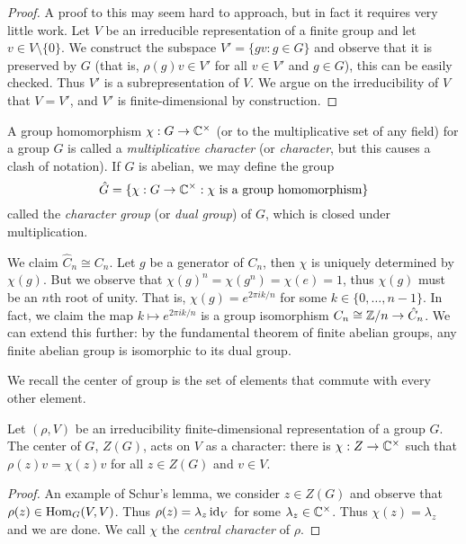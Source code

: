 \begin{proof}
  A proof to this may seem hard to approach, but in fact it requires very little work. Let $V$ be an irreducible representation of a finite group and let $v \in V \setminus \{0\}$. We construct the subspace $V' = \{gv: g \in G\}$ and observe that it is preserved by $G$ (that is, $\rho(g)v \in V'$ for all $v \in V'$ and $g \in G$), this can be easily checked. Thus $V'$ is a subrepresentation of $V$. We argue on the irreducibility of $V$ that $V = V'$, and $V'$ is finite-dimensional by construction.
\end{proof}

A group homomorphism $\chi: G \to \mathbb{C}^\times$ (or to the multiplicative set of any field) for a group $G$ is called a \emph{multiplicative character} (or \emph{character}, but this causes a clash of notation). If $G$ is abelian, we may define the group
\[ \hat G = \{\chi: G \to \mathbb{C}^\times: \text{$\chi$ is a group homomorphism}\} \]
called the \emph{character group} (or \emph{dual group}) of $G$, which is closed under multiplication.

\begin{example}
  We claim $\hat C_n \cong C_n$. Let $g$ be a generator of $C_n$, then $\chi$ is uniquely determined by $\chi(g)$. But we observe that $\chi(g)^n = \chi(g^n)=\chi(e)=1$, thus $\chi(g)$ must be an $n$th root of unity. That is, $\chi(g) = e^{2\pi i k/n}$ for some $k \in \{0, \ldots, n-1\}$. In fact, we claim the map $k \mapsto e^{2\pi i k/n}$ is a group isomorphism $C_n \cong \mathbb{Z}/n \to \hat C_n$. We can extend this further: by the fundamental theorem of finite abelian groups, any finite abelian group is isomorphic to its dual group.
\end{example}

We recall the center of group is the set of elements that commute with every other element.

\begin{proposition}
  Let $(\rho, V)$ be an irreducibility finite-dimensional representation of a group $G$. The center of $G$, $Z(G)$, acts on $V$ as a character: there is $\chi: Z \to \mathbb{C}^\times$ such that
  $\rho(z)v = \chi(z)v$ for all $z \in Z(G)$ and $v \in V$.
\end{proposition}

\begin{proof}
  An example of Schur's lemma, we consider $z \in Z(G)$ and observe that $\rho(z) \in \operatorname{Hom}_G(V,V)$. Thus $\rho(z) = \lambda_z \operatorname{id}_V$ for some $\lambda_z \in \mathbb{C}^\times$. Thus $\chi(z) = \lambda_z$ and we are done. We call $\chi$ the \emph{central character} of $\rho$.
\end{proof}

